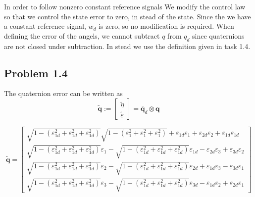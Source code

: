 In order to follow nonzero constant reference signals We  modify the control law so that we control the state error to zero, in stead of the state. 
Since the we have a constant reference signal, $w_d$ is zero, so no modification is required. When defining the error of the angels, we cannot subtract $q$ from $q_d$
since quaternions are not closed under subtraction. In stead we use the definition given in task 1.4.

\subsection*{Problem 1.4}
The quaternion error can be written as
 \begin{equation}
	 \tilde{\mathbf{q}} := \left[
	 \begin{array}{c}
		 \tilde{\eta} \\
		 \tilde{\varepsilon}
	 \end{array}
	 \right] = \bar{\mathbf{q}}_d \otimes \mathbf{q} 
 \end{equation}

\begin{equation}
    \tilde{\mathbf{q}} = 
    \begin{bmatrix}
        \sqrt{1-(\varepsilon^2_{1d} + \varepsilon^2_{1d} +\varepsilon^2_{1d})} 
        \sqrt{1-(\varepsilon^2_{1} + \varepsilon^2_{1} +\varepsilon^2_{1})}
        + \varepsilon_{1d}\varepsilon_{1} + \varepsilon_{2d}\varepsilon_{2} + \varepsilon_{1d}\varepsilon_{1d} \\
        \sqrt{1-(\varepsilon^2_{1d} + \varepsilon^2_{1d} +\varepsilon^2_{1d})} \varepsilon_1 -
        \sqrt{1-(\varepsilon^2_{1d} + \varepsilon^2_{1d} 
        +\varepsilon^2_{1d})} \varepsilon_{1d} 
        -\varepsilon_{2d}\varepsilon_{3} + 
        \varepsilon_{3d}\varepsilon_{2}\\
        \sqrt{1-(\varepsilon^2_{1d} + \varepsilon^2_{1d} +\varepsilon^2_{1d})} \varepsilon_2 -
        \sqrt{1-(\varepsilon^2_{1d} + \varepsilon^2_{1d} 
        +\varepsilon^2_{1d})} \varepsilon_{2d} 
        +\varepsilon_{1d}\varepsilon_{3}
        -\varepsilon_{3d}\varepsilon_{1}
        \\
        \sqrt{1-(\varepsilon^2_{1d} + \varepsilon^2_{1d} +\varepsilon^2_{1d})} \varepsilon_3 -
        \sqrt{1-(\varepsilon^2_{1d} + \varepsilon^2_{1d} +\varepsilon^2_{1d})} \varepsilon_{3d}
        -\varepsilon_{1d}\varepsilon_{2}
        +\varepsilon_{2d}\varepsilon_{1}
        
    \end{bmatrix}
\end{equation} 

